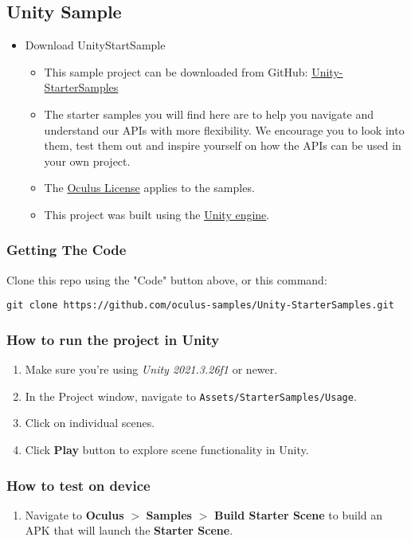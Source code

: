 \documentclass{article}
\begin{document}
\subsection{Unity Sample}

\begin{itemize}
    \item Download UnityStartSample
    \begin{itemize}
        \item This sample project can be downloaded from GitHub: \href{https://github.com/oculus-samples/Unity-StarterSamples}{Unity-StarterSamples}
        \item The starter samples you will find here are to help you navigate and understand our APIs with more flexibility. We encourage you to look into them, test them out and inspire yourself on how the APIs can be used in your own project.
        \item The \href{./LICENSE}{Oculus License} applies to the samples.
        \item This project was built using the \href{https://unity.com/download}{Unity engine}.
    \end{itemize}
\end{itemize}

\subsubsection{Getting The Code}
Clone this repo using the "Code" button above, or this command:
\begin{verbatim}
git clone https://github.com/oculus-samples/Unity-StarterSamples.git
\end{verbatim}

\subsubsection{How to run the project in Unity}
\begin{enumerate}
    \item Make sure you're using \textit{Unity 2021.3.26f1} or newer.
    \item In the Project window, navigate to \texttt{Assets/StarterSamples/Usage}.
    \item Click on individual scenes.
    \item Click \textbf{Play} button to explore scene functionality in Unity.
\end{enumerate}

\subsubsection{How to test on device}
\begin{enumerate}
    \item Navigate to \textbf{Oculus} $>$ \textbf{Samples} $>$ \textbf{Build Starter Scene} to build an APK that will launch the \textbf{Starter Scene}.
    \end{enumerate}
\end{document}
